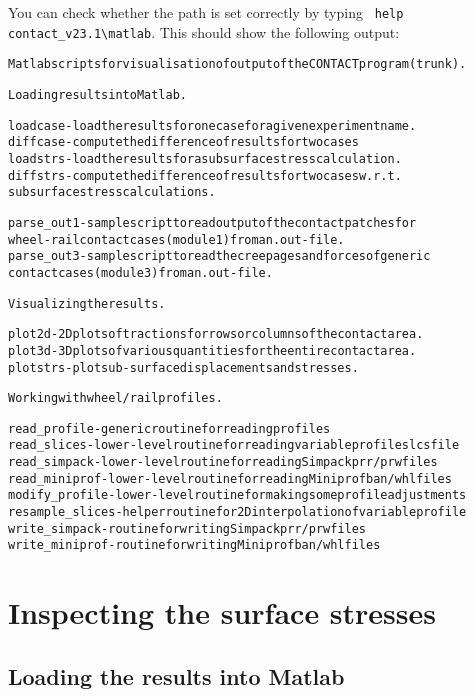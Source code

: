 \documentclass[12pt]{report}
\begin{document}
You can check whether the path is set correctly by typing
\verb+ help contact_v23.1\matlab+. This should show the following output:
\begin{alltt}\small
Matlab scripts for visualisation of output of the CONTACT program (trunk).

Loading results into Matlab.

  loadcase   - load the results for one case for a given experiment name.
  diffcase   - compute the difference of results for two cases
  loadstrs   - load the results for a subsurface stress calculation.
  diffstrs   - compute the difference of results for two cases w.r.t.
               subsurface stress calculations.

  parse_out1 - sample script to read output of the contact patches for
               wheel-rail contact cases (module 1) from an .out-file.
  parse_out3 - sample script to read the creepages and forces of generic
               contact cases (module 3) from an .out-file.

Visualizing the results.

  plot2d     - 2D plots of tractions for rows or columns of the contact area.
  plot3d     - 3D plots of various quantities for the entire contact area.
  plotstrs   - plot sub-surface displacements and stresses.

Working with wheel/rail profiles.

  read_profile    - generic routine for reading profiles
  read_slices     - lower-level routine for reading variable profile slcs file
  read_simpack    - lower-level routine for reading Simpack prr/prw files
  read_miniprof   - lower-level routine for reading Miniprof ban/whl files
  modify_profile  - lower-level routine for making some profile adjustments
  resample_slices - helper routine for 2D interpolation of variable profile
  write_simpack   - routine for writing Simpack prr/prw files
  write_miniprof  - routine for writing Miniprof ban/whl files
\end{alltt}

\section{Inspecting the surface stresses}
\label{sec:plot_surf}

\subsection{Loading the results into Matlab}
\end{document}
